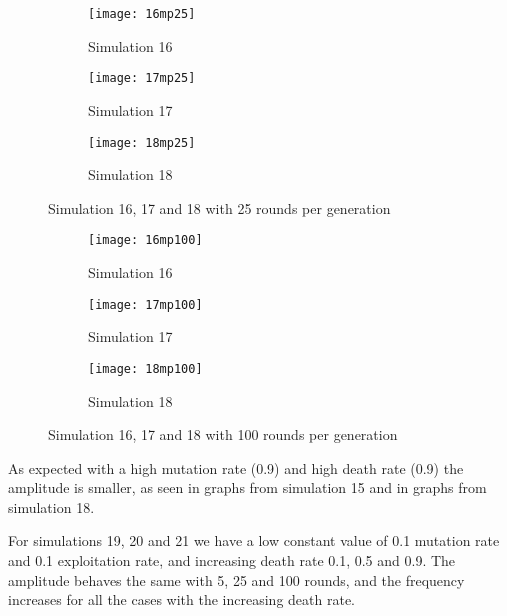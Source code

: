 \begin{figure}[H]       
    \centering
    \begin{subfigure}[b]{0.3\textwidth}
	\centering
	{\texttt{[image: 16mp25]}}   
    	\caption{Simulation 16}
	\label{fig:mpsim1625}
    \end{subfigure}
    \hfill
    \begin{subfigure}[b]{0.3\textwidth}
	\centering
	{\texttt{[image: 17mp25]}}   
    	\caption{Simulation 17}
	\label{fig:mpsim175}
    \end{subfigure}
    \hfill
    \begin{subfigure}[b]{0.3\textwidth}
	\centering
	{\texttt{[image: 18mp25]}}   
    	\caption{Simulation 18}
	\label{fig:mpsim1825}
    \end{subfigure}
    \caption{Simulation 16, 17 and 18 with 25 rounds per generation}
    \label{mpsim161718simulations25}
\end{figure}

\begin{figure}[H]       
    \centering
    \begin{subfigure}[b]{0.3\textwidth}
	\centering
	{\texttt{[image: 16mp100]}}   
    	\caption{Simulation 16}
	\label{fig:mpsim16100}
    \end{subfigure}
    \hfill
    \begin{subfigure}[b]{0.3\textwidth}
	\centering
	{\texttt{[image: 17mp100]}}   
    	\caption{Simulation 17}
	\label{fig:mpsim17100}
    \end{subfigure}
    \hfill
    \begin{subfigure}[b]{0.3\textwidth}
	\centering
	{\texttt{[image: 18mp100]}}   
    	\caption{Simulation 18}
	\label{fig:mpsim18100}
    \end{subfigure}
    \caption{Simulation 16, 17 and 18 with 100 rounds per generation}
    \label{mpsim161718simulations100}
\end{figure}

As expected with a high mutation rate (0.9) and high death rate (0.9) the amplitude is smaller, as seen in graphs from simulation 15 and in graphs from simulation 18.

For simulations 19, 20 and 21 we have a low constant value of 0.1 mutation rate and 0.1 exploitation rate, and increasing death rate 0.1, 0.5 and 0.9. The amplitude behaves the same with 5, 25 and 100 rounds, and the frequency increases for all the cases with the increasing death rate.

